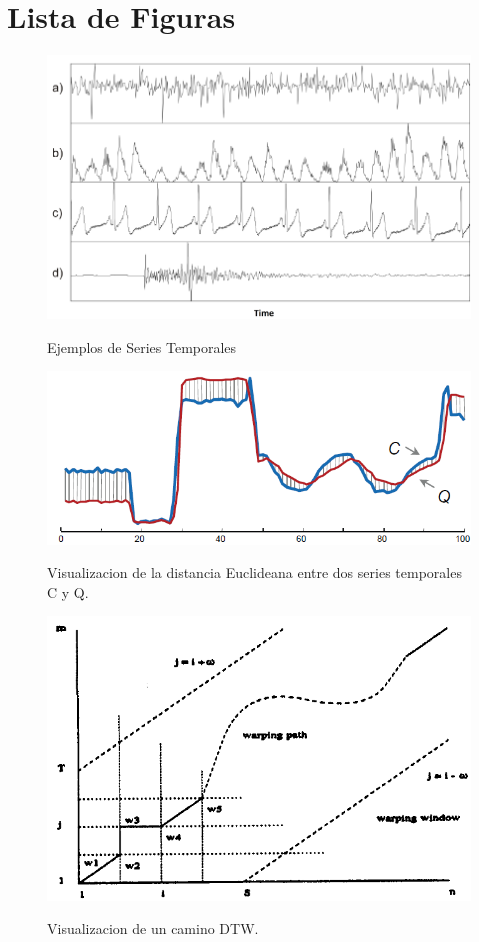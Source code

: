 \section{Lista de Figuras}
\begin{figure}[h]
\vspace{0.1in}
\begin{center}
\includegraphics[scale=0.7]{timeSeries.png}\\
\end{center}
\caption{Ejemplos de Series Temporales}
\label{arm:fig1}
\end{figure}
\begin{figure}[h]
\vspace{0.1in}
\begin{center}
\includegraphics[scale=0.6]{euclidean.png}\\
\end{center}
\caption{Visualizacion de la distancia Euclideana entre dos series temporales C y Q.}
\label{arm:fig1}
\end{figure}
\begin{figure}[h]
\vspace{0.1in}
\begin{center}
\includegraphics[scale=0.6]{dtw.png}\\
\end{center}
\caption{Visualizacion de un camino DTW.}
\label{arm:fig1}
\end{figure}
\clearpage